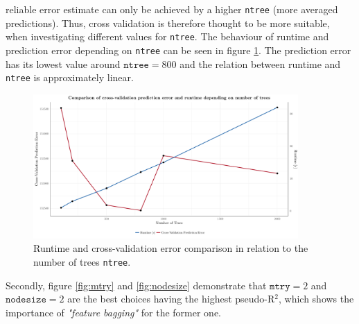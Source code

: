 \documentclass[a4paper,reqno,]{article}
\begin{document}
reliable error estimate can only be achieved by a higher \texttt{ntree} (more averaged predictions). Thus, cross validation is therefore thought to be more suitable, when investigating different values for \texttt{ntree}. The behaviour of runtime and prediction error depending on \texttt{ntree} can be seen in figure \ref{fig:ntrees}. The prediction error has its lowest value around $\texttt{ntree}=800$ and the relation between runtime and \texttt{ntree} is approximately linear.
\newline
\begin{figure}[h!]
\centering
\includegraphics[width=0.9\textwidth]{images/RFR/ntrees.pdf}
    \caption{Runtime and cross-validation error comparison in relation to the number of trees \texttt{ntree}.}
    \label{fig:ntrees}
\end{figure}
\newpage
\noindent
Secondly, figure \ref{fig:mtry} and \ref{fig:nodesize} demonstrate that $\texttt{mtry}=2$ and $\texttt{nodesize}=2$ are the best choices having the highest pseudo-R$^2$, which shows the importance of \textit{"feature bagging"} for the former one. %
\end{document}
